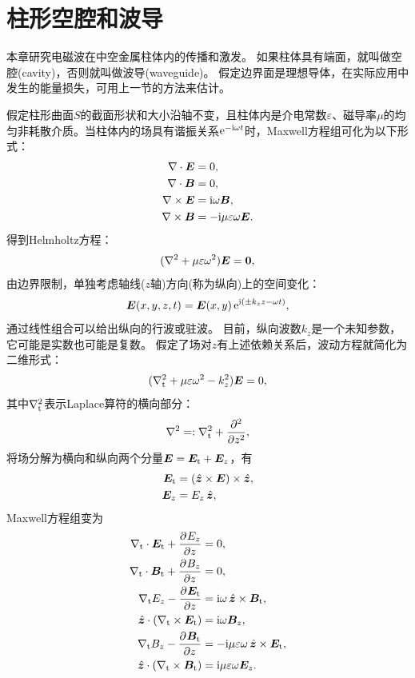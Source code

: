 \section{柱形空腔和波导}
本章研究电磁波在中空金属柱体内的传播和激发。
如果柱体具有端面，就叫做空腔(cavity)，否则就叫做波导(waveguide)。
假定边界面是理想导体，在实际应用中发生的能量损失，可用上一节的方法来估计。

假定柱形曲面$S$的截面形状和大小沿轴不变，且柱体内是介电常数$\varepsilon$、磁导率$\mu$的均匀非耗散介质。当柱体内的场具有谐振关系$\e{-\i\omega t}$时，Maxwell方程组可化为以下形式：
\begin{subequations}
    \begin{align}
        \div\bm E&=0,\\
        \div\bm B&=0,\\
        \curl\bm E&=\i\omega\bm B,\\
        \curl\bm B&=-\i\mu\varepsilon\omega\bm E.
    \end{align}
\end{subequations}
得到Helmholtz方程：
\[
    (\lapla+\mu\varepsilon\omega^2)\bm E=\bm 0,
\]
由边界限制，单独考虑轴线($z$轴)方向(称为纵向)上的空间变化：
\[
    \bm E(x,y,z,t)=\bm E(x,y)\e{\i(\pm k_zz-\omega t)},
\]
通过线性组合可以给出纵向的行波或驻波。
目前，纵向波数$k_z$是一个未知参数，它可能是实数也可能是复数。
假定了场对$z$有上述依赖关系后，波动方程就简化为二维形式：
\begin{equation}
    \label{eqn:lapla_tE}
    (\lapla_\t+\mu\varepsilon\omega^2-k_z^2)\bm E=0,
\end{equation}
其中$\lapla_\t$表示Laplace算符的横向部分：
\[
    \lapla=:\lapla_\t+\pp[2]z,
\]
将场分解为横向和纵向两个分量$\bm E=\bm E_\t+\bm E_z$，有
\begin{subequations}
    \begin{align}
        \bm E_\t&=(\uvec z\times\bm E)\times\uvec z,\\
        \bm E_z&=E_z\uvec z,
    \end{align}
\end{subequations}
Maxwell方程组变为
\begin{subequations}
    \label{eqn:EtEzBtBz}
    \begin{align}
        \nabla_\t\cdot\bm E_\t+\pv{E_z}z&=0,\\
        \nabla_\t\cdot\bm B_\t+\pv{B_z}z&=0,\\
        \nabla_\t E_z-\pv{\bm E_\t}z&=\i\omega\uvec z\times\bm B_\t,\\
        \uvec z\cdot(\nabla_\t\times\bm E_\t)&=\i\omega\bm B_z,\\
        \nabla_\t B_z-\pv{\bm B_\t}z&=-\i\mu\varepsilon\omega\uvec z\times\bm E_\t,\\
        \uvec z\cdot(\nabla_\t\times\bm B_\t)&=\i\mu\varepsilon\omega\bm E_z.
    \end{align}
\end{subequations}
